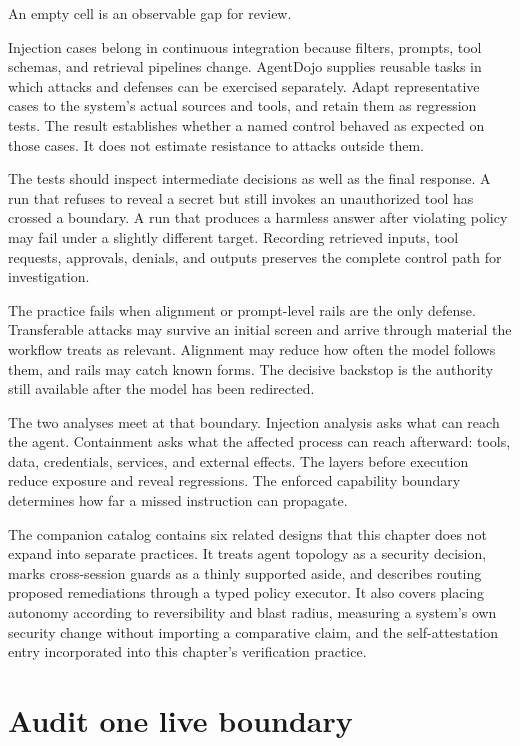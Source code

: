 An empty cell is an observable gap for review.

Injection cases belong in continuous integration because filters, prompts, tool schemas, and retrieval pipelines change. AgentDojo supplies reusable tasks in which attacks and defenses can be exercised separately. Adapt representative cases to the system's actual sources and tools, and retain them as regression tests. The result establishes whether a named control behaved as expected on those cases. It does not estimate resistance to attacks outside them.

The tests should inspect intermediate decisions as well as the final response. A run that refuses to reveal a secret but still invokes an unauthorized tool has crossed a boundary. A run that produces a harmless answer after violating policy may fail under a slightly different target. Recording retrieved inputs, tool requests, approvals, denials, and outputs preserves the complete control path for investigation.

The practice fails when alignment or prompt-level rails are the only defense. Transferable attacks may survive an initial screen and arrive through material the workflow treats as relevant. Alignment may reduce how often the model follows them, and rails may catch known forms. The decisive backstop is the authority still available after the model has been redirected.

The two analyses meet at that boundary. Injection analysis asks what can reach the agent. Containment asks what the affected process can reach afterward: tools, data, credentials, services, and external effects. The layers before execution reduce exposure and reveal regressions. The enforced capability boundary determines how far a missed instruction can propagate.

The companion catalog contains six related designs that this chapter does not expand into separate practices. It treats agent topology as a security decision, marks cross-session guards as a thinly supported aside, and describes routing proposed remediations through a typed policy executor. It also covers placing autonomy according to reversibility and blast radius, measuring a system's own security change without importing a comparative claim, and the self-attestation entry incorporated into this chapter's verification practice.

\hypertarget{audit-one-live-boundary}{%
\section{Audit one live boundary}\label{audit-one-live-boundary}}


